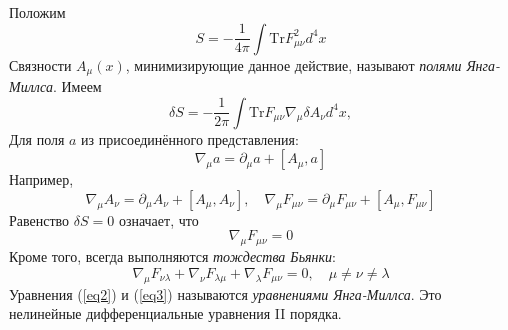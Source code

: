 \documentclass[12pt]{article}
\theoremstyle{definition}
\begin{document}
Положим
\begin{equation}
    S=-\frac{1}{4\pi}\int\text{Tr}F_{\mu\nu}^2d^4x
\end{equation}
Связности $A_\mu(x)$, минимизирующие данное действие, называют \textit{полями Янга-Миллса}. Имеем
\begin{equation}
    \delta S=-\frac{1}{2\pi}\int\text{Tr}F_{\mu\nu}\nabla_\mu\delta A_\nu d^4x,
\end{equation}
Для поля $a$ из присоединённого представления:
\begin{equation}
    \nabla_\mu a=\partial_\mu a+[A_\mu,a]
\end{equation}
Например,
\begin{equation}
    \nabla_\mu A_\nu=\partial_\mu A_\nu+[A_\mu,A_\nu],\quad\nabla_\mu F_{\mu\nu}=\partial_\mu F_{\mu\nu}+[A_\mu,F_{\mu\nu}]
\end{equation}
Равенство $\delta S = 0$ означает, что
\begin{equation}\label{eq2}
    \nabla_\mu F_{\mu\nu}=0
\end{equation}
Кроме того, всегда выполняются \textit{тождества Бьянки}:
\begin{equation}\label{eq3}
    \nabla_\mu F_{\nu\lambda}+\nabla_\nu F_{\lambda\mu}+\nabla_\lambda F_{\mu\nu}=0,\quad\mu\neq\nu\neq\lambda
\end{equation}
Уравнения (\ref{eq2}) и (\ref{eq3}) называются \textit{уравнениями Янга-Миллса}. Это нелинейные дифференциальные уравнения II порядка.
\end{document}
